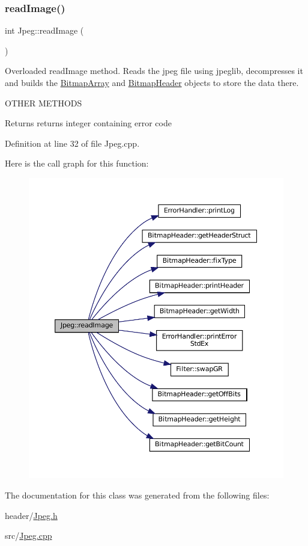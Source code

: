 \subsubsection{\texorpdfstring{readImage()}{readImage()}}
{\footnotesize\ttfamily int Jpeg\+::read\+Image (\begin{DoxyParamCaption}{ }\end{DoxyParamCaption})}



Overloaded read\+Image method. Reads the jpeg file using jpeglib, decompresses it and builds the \mbox{\hyperlink{classBitmapArray}{Bitmap\+Array}} and \mbox{\hyperlink{classBitmapHeader}{Bitmap\+Header}} objects to store the data there. 

O\+T\+H\+ER M\+E\+T\+H\+O\+DS\begin{DoxyReturn}{Returns}
returns integer containing error code 
\end{DoxyReturn}


Definition at line 32 of file Jpeg.\+cpp.

Here is the call graph for this function\+:
\nopagebreak
\begin{figure}[H]
\begin{center}
\leavevmode
\includegraphics[width=350pt]{classJpeg_a80db9e22efc544e32145b6743b2b407c_cgraph}
\end{center}
\end{figure}


The documentation for this class was generated from the following files\+:\begin{DoxyCompactItemize}
\item 
header/\mbox{\hyperlink{Jpeg_8h}{Jpeg.\+h}}\item 
src/\mbox{\hyperlink{Jpeg_8cpp}{Jpeg.\+cpp}}\end{DoxyCompactItemize}
